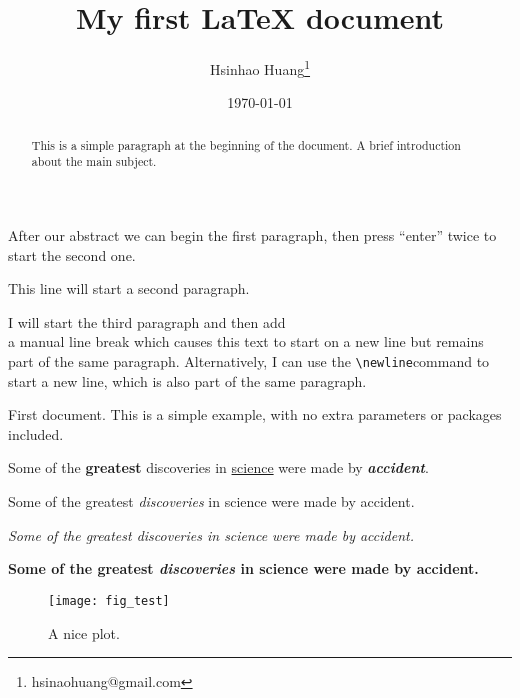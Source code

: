 \documentclass[12pt, a4paper]{article} %
\title{My first LaTeX document}                            %
\author{Hsinhao Huang\thanks{hsinaohuang@gmail.com}}       %
\date{\today}                                              %
\begin{document}

    \maketitle

    \begin{abstract}
        This is a simple paragraph at the beginning of the
        document. A brief introduction about the main subject.
    \end{abstract}


    After our abstract we can begin the first paragraph, then press ``enter'' twice to start the second one.

    This line will start a second paragraph.

    I will start the third paragraph and then add \\ a manual line break which causes
    this text to start on a new line but remains part of the same paragraph.
    Alternatively, I can use the \verb|\newline|\newline command to start a new line,
    which is also part of the same paragraph.

    First document. This is a simple example, with no
    extra parameters or packages included.

    Some of the \textbf{greatest}                          %
    discoveries in \underline{science}                     %
    were made by \textbf{\textit{accident}}.               %

    Some of the greatest \emph{discoveries} in science
    were made by accident.

    \textit{Some of the greatest \emph{discoveries}        %
    in science were made by accident.}

    \textbf{Some of the greatest \emph{discoveries}
    in science were made by accident.}

    \begin{figure}[h]
        \centering
        \texttt{[image: fig\_test]}   %
        \caption
        {
            A nice plot.
        }
        \label{fig:test}
    \end{figure}
\end{document}
